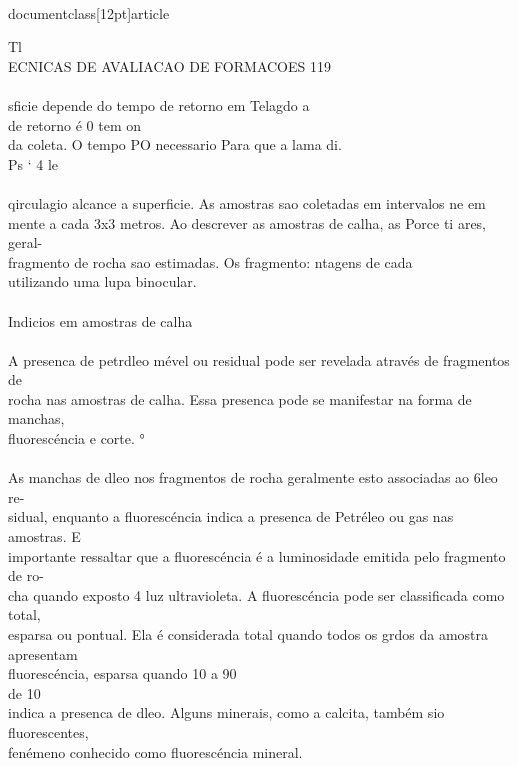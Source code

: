 \\documentclass[12pt]{article}
\begin{document}
Tl\\
ECNICAS DE AVALIACAO DE FORMACOES 119\\
\\
sficie depende do tempo de retorno em Telagdo a\\
de retorno é 0 tem on\\
da coleta. O tempo PO necessario Para que a lama di.\\
Ps ‘ 4 le\\
\\
qirculagio alcance a superficie. As amostras sao coletadas em intervalos ne em\\
mente a cada 3x3 metros. Ao descrever as amostras de calha, as Porce ti ares, geral-\\
fragmento de rocha sao estimadas. Os fragmento: ntagens de cada\\
utilizando uma lupa binocular.\\
\\
Indicios em amostras de calha\\
\\
A presenca de petrdleo mével ou residual pode ser revelada através de fragmentos de\\
rocha nas amostras de calha. Essa presenca pode se manifestar na forma de manchas,\\
fluorescéncia e corte. °\\
\\
As manchas de dleo nos fragmentos de rocha geralmente esto associadas ao 6leo re-\\
sidual, enquanto a fluorescéncia indica a presenca de Petréleo ou gas nas amostras. E\\
importante ressaltar que a fluorescéncia é a luminosidade emitida pelo fragmento de ro-\\
cha quando exposto 4 luz ultravioleta. A fluorescéncia pode ser classificada como total,\\
esparsa ou pontual. Ela é considerada total quando todos os grdos da amostra apresentam\\
fluorescéncia, esparsa quando 10 a 90\\%
de 10\\%
indica a presenca de dleo. Alguns minerais, como a calcita, também sio fluorescentes,\\
fenémeno conhecido como fluorescéncia mineral.\\
\end{document}
